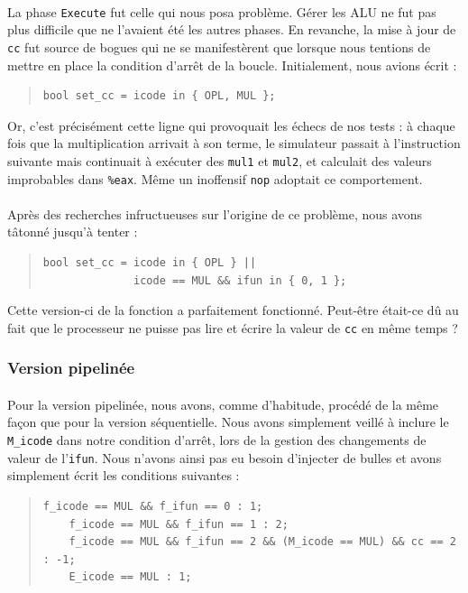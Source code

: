 \documentclass[12pt]{article}
\begin{document}
\paragraph{}La phase \verb+Execute+ fut celle qui nous posa problème. Gérer les ALU ne fut pas plus difficile que ne l'avaient été les autres phases. En revanche, la mise à jour de \verb+cc+ fut source de bogues qui ne se manifestèrent que lorsque nous tentions de mettre en place la condition d'arrêt de la boucle. Initialement, nous avions écrit :
\begin{quote}
\begin{verbatim}
bool set_cc = icode in { OPL, MUL };
\end{verbatim}
\end{quote}
Or, c'est précisément cette ligne qui provoquait les échecs de nos tests : à chaque fois que la multiplication arrivait à son terme, le simulateur passait à l'instruction suivante mais continuait à exécuter des \verb+mul1+ et \verb+mul2+, et calculait des valeurs improbables dans \verb+%eax+. Même un inoffensif \verb+nop+ adoptait ce comportement.

\paragraph{}Après des recherches infructueuses sur l'origine de ce problème, nous avons tâtonné jusqu'à tenter :
\begin{quote}
\begin{verbatim}
bool set_cc = icode in { OPL } ||
              icode == MUL && ifun in { 0, 1 };
\end{verbatim}
\end{quote}
Cette version-ci de la fonction a parfaitement fonctionné. Peut-être était-ce dû au fait que le processeur ne puisse pas lire et écrire la valeur de \verb+cc+ en même temps ?

\subsubsection{Version pipelinée}
\paragraph{}Pour la version pipelinée, nous avons, comme d'habitude, procédé de la même façon que pour la version séquentielle. Nous avons simplement veillé à inclure le \verb+M_icode+ dans notre condition d'arrêt, lors de la gestion des changements de valeur de l'\verb+ifun+. Nous n'avons ainsi pas eu besoin d'injecter de bulles et avons simplement écrit les conditions suivantes :
\begin{quote}
  \begin{verbatim}
f_icode == MUL && f_ifun == 0 : 1;
	f_icode == MUL && f_ifun == 1 : 2;
	f_icode == MUL && f_ifun == 2 && (M_icode == MUL) && cc == 2 : -1;
	E_icode == MUL : 1;
\end{verbatim}
\end{quote}
\end{document}
